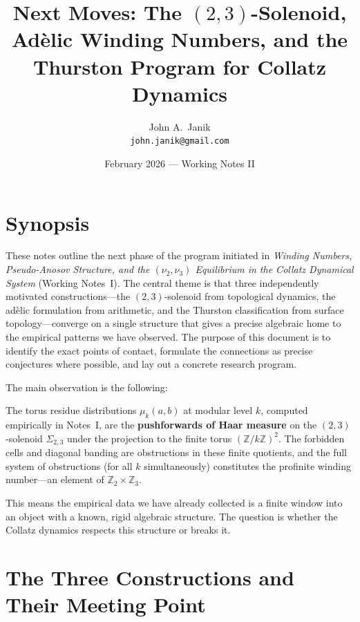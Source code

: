 \documentclass[11pt,a4paper]{article}
\title{\textbf{Next Moves: The $(2,3)$-Solenoid,\\
Ad\`elic Winding Numbers, and the\\
Thurston Program for Collatz Dynamics}}
\author{John A.\ Janik\\
\texttt{john.janik@gmail.com}}
\date{February 2026 --- Working Notes II}
\newcommand{\Z}{\mathbb{Z}}
\theoremstyle{plain}
\theoremstyle{definition}
\begin{document}
\maketitle

\tableofcontents
\newpage

\section{Synopsis}

These notes outline the next phase of the program initiated in \emph{Winding Numbers, Pseudo-Anosov Structure, and the $(\nu_2, \nu_3)$ Equilibrium in the Collatz Dynamical System} (Working Notes~I). The central theme is that three independently motivated constructions---the $(2,3)$-solenoid from topological dynamics, the ad\`elic formulation from arithmetic, and the Thurston classification from surface topology---converge on a single structure that gives a precise algebraic home to the empirical patterns we have observed. The purpose of this document is to identify the exact points of contact, formulate the connections as precise conjectures where possible, and lay out a concrete research program.

The main observation is the following:

\begin{keyinsight}
The torus residue distributions $\mu_k(a,b)$ at modular level $k$, computed empirically in Notes~I, are the \textbf{pushforwards of Haar measure} on the $(2,3)$-solenoid $\Sigma_{2,3}$ under the projection to the finite torus $(\Z/k\Z)^2$. The forbidden cells and diagonal banding are obstructions in these finite quotients, and the full system of obstructions (for all $k$ simultaneously) constitutes the profinite winding number---an element of $\Z_2 \times \Z_3$.
\end{keyinsight}

This means the empirical data we have already collected is a finite window into an object with a known, rigid algebraic structure. The question is whether the Collatz dynamics respects this structure or breaks it.


\section{The Three Constructions and Their Meeting Point}\label{sec:three}
\end{document}
